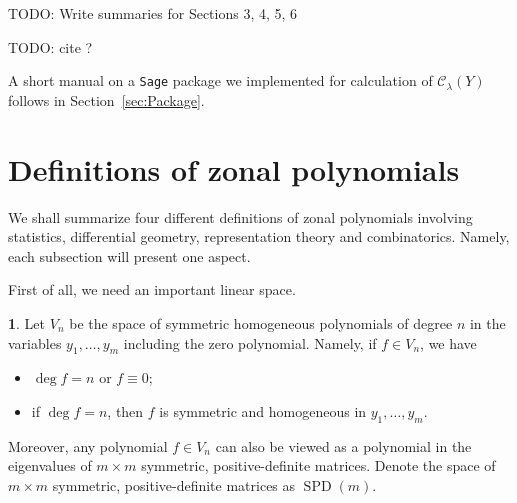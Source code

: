 \documentclass[10pt,oneside,american]{amsart}
\numberwithin{equation}{section}
\numberwithin{figure}{section}
\theoremstyle{plain}
\theoremstyle{definition}
\newtheorem{defn}[thm]{\protect\definitionname}
\theoremstyle{remark}
\theoremstyle{plain}
\theoremstyle{definition}
\theoremstyle{plain}
\theoremstyle{plain}
\newcommand{\SPD}{\operatorname{SPD}}
\providecommand{\definitionname}{Definition}
\begin{document}
TODO: Write summaries for Sections 3, 4, 5, 6

TODO: cite \cite{Moakher}?

A short manual on a \texttt{Sage} package we implemented
for calculation of $\mathcal{C}_{\lambda}(Y)$ follows
in Section~\ref{sec:Package}.


\section{\label{sec:DEFS}Definitions of zonal polynomials}

We shall summarize four different definitions of zonal polynomials
involving statistics, differential geometry, representation theory
and combinatorics. Namely, each subsection will present one aspect. 

First of all, we need an important linear space.
\begin{defn}
Let $V_{n}$ be the space of symmetric homogeneous polynomials of
degree $n$ in the variables $y_{1},\ldots,y_{m}$ including the zero polynomial.
Namely, if $f\in V_{n}$, we have 
\begin{itemize}
\item $\deg f=n$ or $f\equiv0$;
\item if $\deg f=n$, then $f$ is symmetric and homogeneous in $y_{1},\ldots,y_{m}$.
\end{itemize}
Moreover, any polynomial $f\in V_{n}$ can also be viewed as a polynomial
in the eigenvalues of $m\times m$ symmetric, positive-definite matrices.
Denote the space of $m\times m$ symmetric, positive-definite matrices
as $\SPD(m)$. 
\end{defn}
\end{document}

